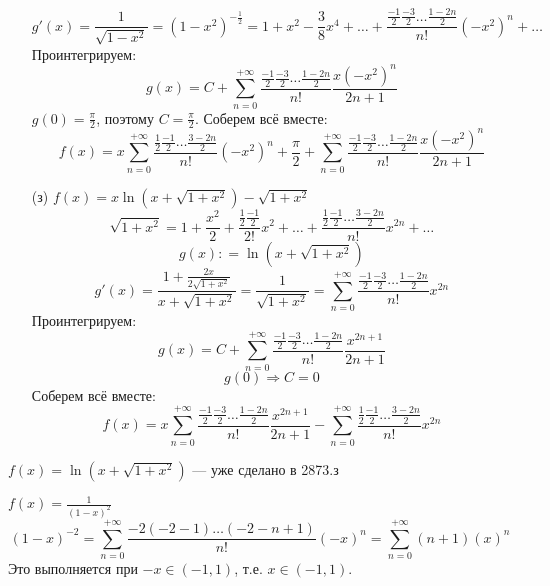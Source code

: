 \begin{exercise}[2873]
\begin{itemize}
              \[g'(x) = \frac{1}{\sqrt{1 - x^2}} = (1 - x^2)^{ -\frac{1}{2}} = 1 + x^2 - \frac{3}{8} x^4 + \dots + \frac{\frac{ -1}{2}\frac{ - 3}{2}\dots \frac{1 - 2n}{2}}{n!} ( -x^2)^n + \dots \]
              Проинтегрируем:
              \[g(x) = C + \sum_{n = 0}^{+\infty} \frac{\frac{ -1}{2}\frac{ - 3}{2}\dots \frac{1 - 2n}{2}}{n!} \frac{x( - x^2)^n}{2n + 1} \]
              \(g(0) =\frac{\pi}{2}\), поэтому \(C =\frac{\pi}{2}\).
              Соберем всё вместе:
              \[f(x) = x \sum_{n = 0}^{+\infty} \frac{\frac{1}{2}\frac{ -1}{2}\dots \frac{3 - 2n}{2}}{n!} ( -x^2)^n + \frac{\pi}{2} + \sum_{n = 0}^{+\infty} \frac{\frac{ -1}{2}\frac{ - 3}{2}\dots \frac{1 - 2n}{2}}{n!} \frac{x( - x^2)^n}{2n + 1}\]
        \item [(з)] \(f(x) = x \ln (x +\sqrt{1 + x^2}) - \sqrt{1 + x^2}\)
              \[\sqrt{1 + x^2} = 1 + \frac{x^2}{2} + \frac{\frac{1}{2}\frac{ - 1}{2}}{2!} x^2 + \dots + \frac{\frac{1}{2}\frac{ -1}{2}\dots \frac{3 - 2n}{2}}{n!} x^{2n} + \dots \]
              \[g(x) : = \ln(x + \sqrt{1 + x^2})\]
              \[g'(x) = \frac{1 + \frac{2x}{2\sqrt{1 + x^2}}}{x + \sqrt{1 + x^2}} = \frac{1}{\sqrt{1 + x^2}} = \sum_{n = 0}^{+\infty} \frac{\frac{ -1}{2}\frac{ -3}{2}\dots \frac{1 - 2n}{2}}{n!} x^{2n}\]
              Проинтегрируем:
              \[g(x) = C + \sum_{n = 0}^{+\infty} \frac{\frac{ -1}{2}\frac{ -3}{2}\dots \frac{1 - 2n}{2}}{n!} \frac{x^{2n + 1}}{2n + 1}\]
              \[g(0) \Rightarrow C = 0\]
              Соберем всё вместе:
              \[f(x) = x \sum_{n = 0}^{+\infty} \frac{\frac{ -1}{2}\frac{ -3}{2}\dots \frac{1 - 2n}{2}}{n!} \frac{x^{2n + 1}}{2n + 1} - \sum_{n = 0}^{+\infty} \frac{\frac{1}{2}\frac{ -1}{2}\dots \frac{3 - 2n}{2}}{n!} x^{2n}\]
    \end{itemize}
\end{exercise}

\begin{exercise}[2871]
    \(f(x) = \ln(x + \sqrt{1 + x^2})\) --- уже сделано в 2873.з
\end{exercise}

\begin{exercise}[2855]
    \(f(x) = \frac{1}{(1 - x)^2}\)
    \[(1 - x)^{ - 2} = \sum_{n = 0}^{+\infty} \frac{ - 2( - 2 - 1)\dots ( - 2 - n + 1)}{n!} ( -x)^n = \sum_{n = 0}^{+\infty} (n + 1)(x)^n\]
    Это выполняется при \( - x\in ( - 1, 1)\), т.е. \(x\in ( - 1, 1)\).
\end{exercise}

